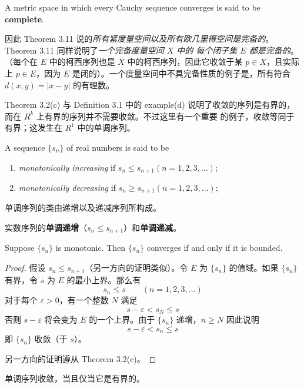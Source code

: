 \documentclass[../poma-notes.tex]{subfiles}
\begin{document}

\begin{definition}
  A metric space in which every Cauchy sequence converges is said to be \textbf{complete}.
\end{definition}

因此 Theorem 3.11 说的\textit{所有紧度量空间以及所有欧几里得空间是完备的}。Theorem 3.11 同样说明了\textit{一个完备度量空间 $X$ 中的
  每个闭子集 $E$ 都是完备的}。（每个在 $E$ 中的柯西序列也是 $X$ 中的柯西序列，因此它收敛于某 $p \in X$，且实际上 $p \in E$，因为 $E$
是闭的）。一个度量空间中不具完备性质的例子是，所有符合 $d(x,y) = |x - y|$ 的有理数。

Theorem 3.2(c) 与 Definition 3.1 中的 example(d) 说明了收敛的序列是有界的，而在 $R^k$ 上有界的序列并不需要收敛。不过这里有一个重要
的例子，收敛等同于有界；这发生在 $R^1$ 中的单调序列。

\begin{definition}
  A sequence $\{s_n\}$ of real numbers is said to be
  \begin{enumerate}[label=(\alph*)]
    \item \textit{monotonically increasing} if $s_n \le s_{n+1} (n=1,2,3,\dots)$;
    \item \textit{monotonically decreasing} if $s_n \ge s_{n+1} (n=1,2,3,\dots)$;
  \end{enumerate}
\end{definition}

单调序列的类由递增以及递减序列所构成。

\begin{anote}
  实数序列的\textbf{单调递增}（$s_n \le s_{n+1}$）和\textbf{单调递减}。
\end{anote}


\begin{theorem}
  Suppose $\{s_n\}$ is monotonic. Then $\{s_n\}$ converges if and only if it is bounded.
\end{theorem}

\begin{proof}
  假设 $s_n \le s_{n+1}$（另一方向的证明类似）。令 $E$ 为 $\{s_n\}$ 的值域。如果 $\{s_n\}$ 有界，令 $s$ 为 $E$ 的最小上界。那么有
  \[ s_n \le s \qquad (n=1,2,3,\dots) \]
  对于每个 $\varepsilon > 0$，有一个整数 $N$ 满足
  \[ s - \varepsilon < s_N \le s \]
  否则 $s - \varepsilon$ 将会变为 $E$ 的一个上界。由于 $\{s_n\}$ 递增，$n \ge N$ 因此说明
  \[ s - \varepsilon < s_n \le s \]
  即 $\{s_n\}$ 收敛（于 $s$）。

  另一方向的证明遵从 Theorem 3.2(c)。
\end{proof}

\begin{anote}
  单调序列收敛，当且仅当它是有界的。
\end{anote}
\end{document}
